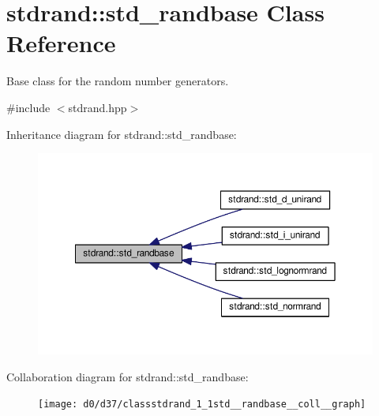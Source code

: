 \hypertarget{classstdrand_1_1std__randbase}{}\section{stdrand\+:\+:std\+\_\+randbase Class Reference}
\label{classstdrand_1_1std__randbase}


Base class for the random number generators.  




{\ttfamily \#include $<$stdrand.\+hpp$>$}



Inheritance diagram for stdrand\+:\+:std\+\_\+randbase\+:\nopagebreak
\begin{figure}[H]
\begin{center}
\leavevmode
\includegraphics[width=350pt]{d1/d27/classstdrand_1_1std__randbase__inherit__graph}
\end{center}
\end{figure}


Collaboration diagram for stdrand\+:\+:std\+\_\+randbase\+:\nopagebreak
\begin{figure}[H]
\begin{center}
\leavevmode
\texttt{[image: d0/d37/classstdrand\_1\_1std\_\_randbase\_\_coll\_\_graph]}
\end{center}
\end{figure}
